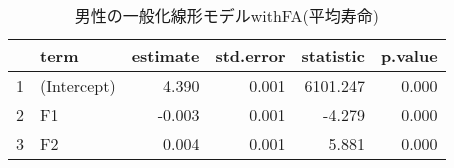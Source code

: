 \begin{table}[ht]
\centering
\begingroup\tiny
\begin{tabular}{rlrrrr}
  \hline
 & term & estimate & std.error & statistic & p.value \\ 
  \hline
1 & (Intercept) & 4.390 & 0.001 & 6101.247 & 0.000 \\ 
  2 & F1 & -0.003 & 0.001 & -4.279 & 0.000 \\ 
  3 & F2 & 0.004 & 0.001 & 5.881 & 0.000 \\ 
   \hline
\end{tabular}
\endgroup
\caption{男性の一般化線形モデルwithFA(平均寿命)} 
\label{table_Gamma_LE_FA_m}
\end{table}
